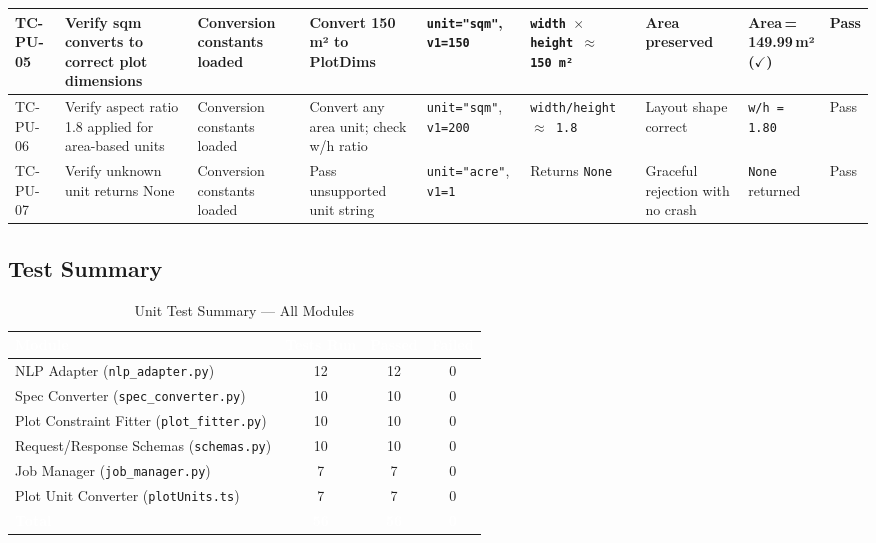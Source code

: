 \begin{landscape}
\begin{longtable}{|p{1.4cm}|p{3.2cm}|p{2.8cm}|p{2.8cm}|p{2.8cm}|p{2.8cm}|p{2.6cm}|p{2.8cm}|p{1.0cm}|}
\rowcolor{passgreen}
TC-PU-05 & Verify sqm converts to correct plot dimensions & Conversion constants loaded & Convert 150\,m² to PlotDims & \texttt{unit="sqm"}, \texttt{v1=150} & \texttt{width $\times$ height $\approx$ 150\,m²} & Area preserved & Area\,=\,149.99\,m² ($\checkmark$) & Pass \\ \hline

\rowcolor{passgreen}
TC-PU-06 & Verify aspect ratio 1.8 applied for area-based units & Conversion constants loaded & Convert any area unit; check w/h ratio & \texttt{unit="sqm"}, \texttt{v1=200} & \texttt{width/height $\approx$ 1.8} & Layout shape correct & \texttt{w/h\,=\,1.80} & Pass \\ \hline

\rowcolor{passgreen}
TC-PU-07 & Verify unknown unit returns None & Conversion constants loaded & Pass unsupported unit string & \texttt{unit="acre"}, \texttt{v1=1} & Returns \texttt{None} & Graceful rejection with no crash & \texttt{None} returned & Pass \\ \hline

\end{longtable}
\end{landscape}

\subsection{Test Summary}

\begin{table}[h]
\centering
\small
\begin{tabular}{|l|c|c|c|}
\hline
\rowcolor{tableheader}
\textcolor{white}{\textbf{Module}} & \textcolor{white}{\textbf{Tests Run}} & \textcolor{white}{\textbf{Passed}} & \textcolor{white}{\textbf{Failed}} \\
\hline
NLP Adapter (\texttt{nlp\_adapter.py})         & 12 & 12 & 0 \\
\hline
Spec Converter (\texttt{spec\_converter.py})   & 10 & 10 & 0 \\
\hline
Plot Constraint Fitter (\texttt{plot\_fitter.py}) & 10 & 10 & 0 \\
\hline
Request/Response Schemas (\texttt{schemas.py}) & 10 & 10 & 0 \\
\hline
Job Manager (\texttt{job\_manager.py})         &  7 &  7 & 0 \\
\hline
Plot Unit Converter (\texttt{plotUnits.ts})    &  7 &  7 & 0 \\
\hline
\rowcolor{tableheader}
\textcolor{white}{\textbf{Total}} & \textcolor{white}{\textbf{56}} & \textcolor{white}{\textbf{56}} & \textcolor{white}{\textbf{0}} \\
\hline
\end{tabular}
\caption{Unit Test Summary — All Modules}
\label{tab:summary}
\end{table}
